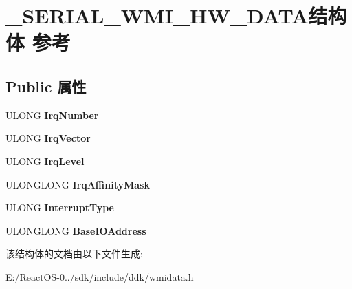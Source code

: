 \hypertarget{struct___s_e_r_i_a_l___w_m_i___h_w___d_a_t_a}{}\section{\+\_\+\+S\+E\+R\+I\+A\+L\+\_\+\+W\+M\+I\+\_\+\+H\+W\+\_\+\+D\+A\+T\+A结构体 参考}
\label{struct___s_e_r_i_a_l___w_m_i___h_w___d_a_t_a}
\subsection*{Public 属性}
\begin{DoxyCompactItemize}
\item 
\mbox{\label{struct___s_e_r_i_a_l___w_m_i___h_w___d_a_t_a_a01beba036a22716e4048ffd2b5467b31}} 
U\+L\+O\+NG {\bfseries Irq\+Number}
\item 
\mbox{\label{struct___s_e_r_i_a_l___w_m_i___h_w___d_a_t_a_abaaddb97c9e47fdf126663dac8257756}} 
U\+L\+O\+NG {\bfseries Irq\+Vector}
\item 
\mbox{\label{struct___s_e_r_i_a_l___w_m_i___h_w___d_a_t_a_a1db857e1a20292c8094e85b3026b9a62}} 
U\+L\+O\+NG {\bfseries Irq\+Level}
\item 
\mbox{\label{struct___s_e_r_i_a_l___w_m_i___h_w___d_a_t_a_aa721694f90ff675dd6d1a2d532d58a17}} 
U\+L\+O\+N\+G\+L\+O\+NG {\bfseries Irq\+Affinity\+Mask}
\item 
\mbox{\label{struct___s_e_r_i_a_l___w_m_i___h_w___d_a_t_a_a94c819f327a7f1838a34dad2f848b17f}} 
U\+L\+O\+NG {\bfseries Interrupt\+Type}
\item 
\mbox{\label{struct___s_e_r_i_a_l___w_m_i___h_w___d_a_t_a_ab9928f2fdb3be6c0db8f451249f71389}} 
U\+L\+O\+N\+G\+L\+O\+NG {\bfseries Base\+I\+O\+Address}
\end{DoxyCompactItemize}


该结构体的文档由以下文件生成\+:\begin{DoxyCompactItemize}
\item 
E\+:/\+React\+O\+S-\/0../sdk/include/ddk/wmidata.\+h\end{DoxyCompactItemize}
